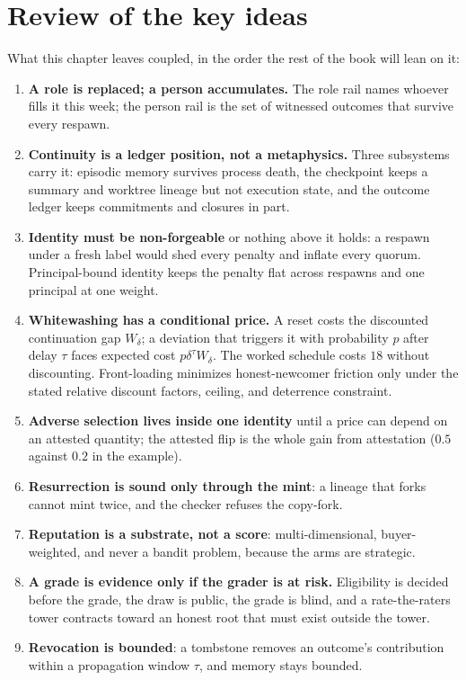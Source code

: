 \documentclass[11pt,a4paper]{article}
\theoremstyle{definition}
\begin{document}

\section*{Review of the key ideas}

What this chapter leaves coupled, in the order the rest of the book will lean on it:

\begin{enumerate}[leftmargin=1.6em,itemsep=2pt]
\item \textbf{A role is replaced; a person accumulates.} The role rail names whoever fills it this week; the person rail is the set of witnessed outcomes that survive every respawn.
\item \textbf{Continuity is a ledger position, not a metaphysics.} Three subsystems carry it: episodic memory survives process death, the checkpoint keeps a summary and worktree lineage but not execution state, and the outcome ledger keeps commitments and closures in part.
\item \textbf{Identity must be non-forgeable} or nothing above it holds: a respawn under a fresh label would shed every penalty and inflate every quorum. Principal-bound identity keeps the penalty flat across respawns and one principal at one weight.
\item \textbf{Whitewashing has a conditional price.} A reset costs the discounted continuation gap $W_\delta$; a deviation that triggers it with probability $p$ after delay $\tau$ faces expected cost $p\delta^\tau W_\delta$. The worked schedule costs $18$ without discounting. Front-loading minimizes honest-newcomer friction only under the stated relative discount factors, ceiling, and deterrence constraint.
\item \textbf{Adverse selection lives inside one identity} until a price can depend on an attested quantity; the attested flip is the whole gain from attestation ($0.5$ against $0.2$ in the example).
\item \textbf{Resurrection is sound only through the mint}: a lineage that forks cannot mint twice, and the checker refuses the copy-fork.
\item \textbf{Reputation is a substrate, not a score}: multi-dimensional, buyer-weighted, and never a bandit problem, because the arms are strategic.
\item \textbf{A grade is evidence only if the grader is at risk.} Eligibility is decided before the grade, the draw is public, the grade is blind, and a rate-the-raters tower contracts toward an honest root that must exist outside the tower.
\item \textbf{Revocation is bounded}: a tombstone removes an outcome's contribution within a propagation window $\tau$, and memory stays bounded.
\end{enumerate}
\end{document}

